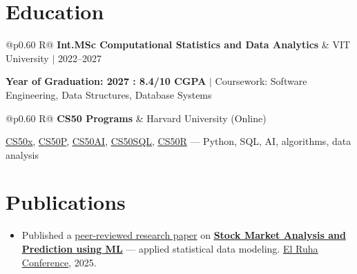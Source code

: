\documentclass[a4paper,10pt]{article}
\newcommand{\ulink}[2]{\href{#1}{\uline{#2}}}
\newcommand{\subheading}[1]{{\color[HTML]{0A0A0A}\fontsize{12}{14}\selectfont\bfseries #1}}
\newcommand{\meta}[1]{{\color[HTML]{5C5C5C}\fontsize{10.5}{12.5}\selectfont #1}}
\begin{document}
\vspace{2pt}

\section{Education}
\vspace{2pt}

\begin{tabularx}{\linewidth}{@{}p{0.60\linewidth} R@{}}
\subheading{Int.MSc Computational Statistics and Data Analytics} & \meta{VIT University $|$ 2022--2027}
\end{tabularx}
\vspace{1pt}
{\color[HTML]{3A3A3A}\fontsize{11}{14}\selectfont \textbf{Year of Graduation: 2027 : 8.4/10 CGPA} $|$ Coursework: Software Engineering, Data Structures, Database Systems}

\begin{tabularx}{\linewidth}{@{}p{0.60\linewidth} R@{}}
\subheading{CS50 Programs} & \meta{Harvard University (Online)}
\end{tabularx}
\vspace{1pt}
{\color[HTML]{3A3A3A}\fontsize{11}{14}\selectfont \ulink{https://cs50.harvard.edu/certificates/b14b78df-e05c-413e-a607-1dd27303053a}{CS50x}, \ulink{https://cs50.harvard.edu/certificates/32477052-9db4-49c4-a5a4-d7e58429ca2c}{CS50P}, \ulink{https://cs50.harvard.edu/certificates/9cdb4d4a-1250-4f8e-9fd7-191864e0f919}{CS50AI}, \ulink{https://cs50.harvard.edu/certificates/bc486f24-f085-4e61-8536-80940b97a1b9}{CS50SQL}, \ulink{https://cs50.harvard.edu/certificates/666838e6-a053-4d82-b179-a60fe745fd84}{CS50R} --- Python, SQL, AI, algorithms, data analysis}

\vspace{2pt}

\section{Publications}
\vspace{2pt}
\begin{itemize}[nosep, leftmargin=1.5em, itemsep=1pt, topsep=2pt]
  \item {\color[HTML]{0A0A0A}\fontsize{11}{14}\selectfont
  Published a \ulink{https://www.elruha.org/_files/ugd/614b1f_6b95e1b697bf452b9907ba46e0151c05.pdf\#page=774}{peer-reviewed research paper} on \ulink{https://github.com/su-jin1425/Set-Project}{\textbf{Stock Market Analysis and Prediction using ML}} --- applied statistical data modeling. \ulink{https://www.elruha.org/congress-books}{El Ruha Conference}, 2025.}
\end{itemize}
\end{document}
